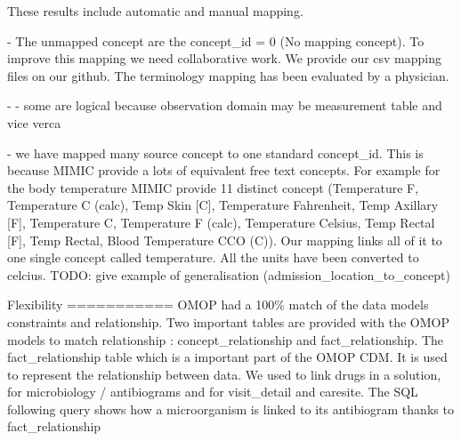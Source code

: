 These results include automatic and manual mapping.

- The unmapped concept are the concept\_id = 0 (No mapping concept). To improve this mapping we need collaborative work. We provide our csv mapping files on our github.
The terminology mapping has been evaluated by a physician. 

- %
	- some are logical because observation domain may be measurement table and vice verca

- we have mapped  many source concept to one standard concept\_id. This is because MIMIC provide a lots of equivalent free text concepts.
  For example for the body temperature MIMIC provide 11 distinct concept (Temperature F, Temperature C (calc), Temp Skin [C], Temperature Fahrenheit, Temp Axillary [F], Temperature C, Temperature F (calc), Temperature Celsius, Temp Rectal [F], Temp Rectal, Blood Temperature CCO (C)). Our mapping links all of it to one single concept called temperature. All the units have been converted to celcius.
  TODO: give example of generalisation (admission\_location\_to\_concept)

Flexibility  
===========
OMOP had a 100\% match of the data models constraints and relationship.
Two important tables are provided with the OMOP models to  match relationship : concept\_relationship and fact\_relationship.
The fact\_relationship table which is a important part of the OMOP CDM. It is used to represent the relationship between data.
We used to link drugs in a solution, for microbiology / antibiograms and for visit\_detail and caresite.
The SQL following query shows how a microorganism is linked to its antibiogram thanks to fact\_relationship

%


